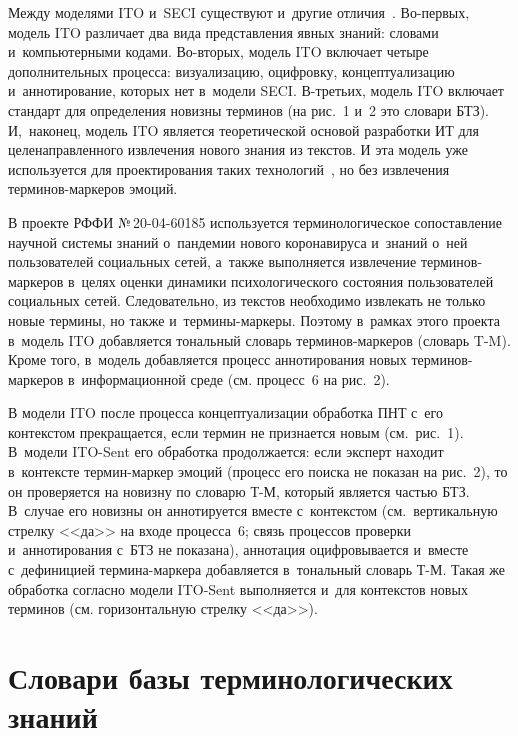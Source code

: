 \begin{multicols}{2}
  Между моделями ITO и~SECI существуют и~другие отличия~\cite{5-zac}.  
Во-пер\-вых, модель ITO различает два вида представления явных знаний: 
словами и~компьютерными кодами. Во-вто\-рых, модель ITO включает четыре 
дополнительных процесса: визуализацию, оцифровку, концептуализацию 
и~аннотирование, которых нет в~модели SECI. В-треть\-их, модель ITO включает 
стандарт для определения новизны терминов (на рис.~1 и~2 это словари БТЗ). 
И,~наконец, модель ITO является теоретической основой разработки 
ИТ для целенаправленного извлечения нового знания из 
текстов. И эта модель уже используется для проектирования таких 
технологий~\cite{6-zac, 7-zac, 12-zac, 19-zac}, но без извлечения  
тер\-ми\-нов-мар\-ке\-ров эмоций.
  



  В проекте РФФИ №\,20-04-60185 используется терминологическое сопоставление 
научной системы знаний о~пандемии нового коронавируса и~знаний о~ней 
пользователей социальных сетей, а~также выполняется извлечение 
 тер\-ми\-нов-мар\-ке\-ров в~целях оценки динамики психологического состояния 
пользователей социальных сетей. Следовательно, из текстов необходимо 
извлекать не только новые термины, но также и~термины-маркеры. Поэтому 
в~рамках этого проекта в~модель ITO добавляется тональный словарь  
тер\-ми\-нов-мар\-ке\-ров (словарь \mbox{T-M}). Кроме того, в~модель добавляется 
процесс аннотирования новых тер\-ми\-нов-мар\-ке\-ров в~информационной среде 
(см. процесс~6 на рис.~2).
  
  В модели ITO после процесса концептуализации обработка ПНТ с~его 
контекстом прекращается, если термин не признается новым (см.\ рис.~1). В~модели 
ITO-Sent его обработка продолжается: если эксперт находит в~контексте тер\-мин-мар\-кер эмоций (процесс его поиска не показан на рис.~2), то он проверяется на 
новизну по словарю Т-М, который является частью БТЗ. В~случае его новизны он 
аннотируется вместе с~контекстом (см.\ вертикальную стрелку <<да>> на входе 
процесса~6; связь процессов проверки и~аннотирования с~БТЗ не показана), 
аннотация оцифровывается и~вместе с~дефиницией термина-маркера добавляется 
в~тональный словарь Т-М. Такая же обработка согласно модели ITO-Sent 
выполняется и~для контекстов новых терминов (см. горизонтальную стрелку 
<<да>>).
  
\section{Словари базы терминологических знаний}


\end{multicols}

